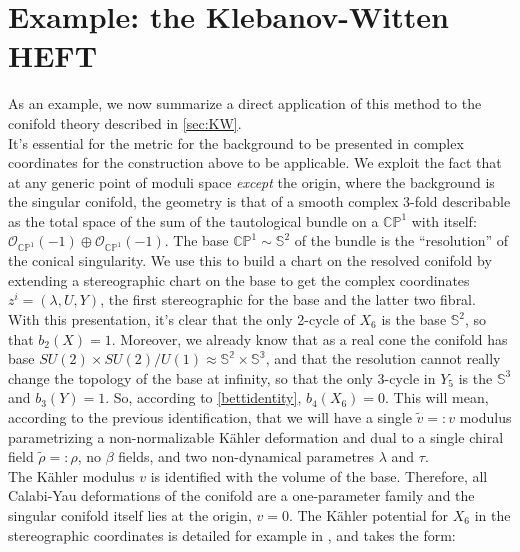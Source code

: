 
\section{Example: the Klebanov-Witten HEFT}

As an example, we now summarize a direct application of this method to the conifold theory described in \ref{sec:KW}.\\

It's essential for the metric for the background to be presented in complex coordinates for the construction above to be applicable. We exploit the fact that at any generic point of moduli space \emph{except} the origin, where the background is the singular conifold, the geometry is that of a smooth complex 3-fold describable as the total space of the sum of the tautological bundle on a $\mathbb{CP}^1$ with itself: $\mathcal{O}_{\mathbb{CP}^1}(-1) \oplus \mathcal{O}_{\mathbb{CP}^1}(-1)$. The base $\mathbb{CP}^1 \sim \mathbb{S}^2$ of the bundle is the ``resolution'' of the conical singularity. We use this to build a chart on the resolved conifold by extending a stereographic chart on the base to get the complex coordinates $z^i = (\lambda, U, Y)$, the first stereographic for the base and the latter two fibral.\\

With this presentation, it's clear that the only 2-cycle of $X_6$ is the base $\mathbb{S}^2$, so that $b_2(X) = 1$. Moreover, we already know that as a real cone the conifold has base $SU(2)\times SU(2) / U(1) \approx \mathbb{S^2} \times \mathbb{S^3}$, and that the resolution cannot really change the topology of the base at infinity, so that the only 3-cycle in $Y_5$ is the $\mathbb{S}^3$ and $b_3(Y) = 1$. So, according to \ref{bettidentity}, $b_4(X_6) = 0$. This will mean, according to the previous identification, that we will have a single $\tilde v =: v$ modulus parametrizing a non-normalizable K\"ahler deformation and dual to a single chiral field $\tilde\rho =: \rho$, no $\beta$ fields, and two non-dynamical parametres $\lambda$ and $\tau$. \\

The K\"ahler modulus $v$ is identified with the volume of the base. Therefore, all Calabi-Yau deformations of the conifold are a one-parameter family and the singular conifold itself lies at the origin, $v=0$. The K\"ahler potential for $X_6$ in the stereographic coordinates is detailed for example in \cite{PandoZayas}, and takes the form:

